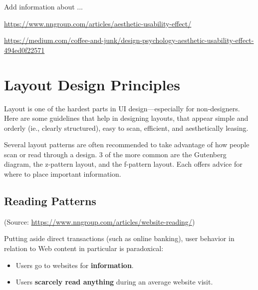 \begin{tcolorbox}[
	width=\textwidth,
	title={\textbf{Excursus: What is the Aesthetic-Usability Effect?}},
	outer arc=0mm,
	arc=0mm,
	boxrule=1pt,
	]    
Add information about ...
\par \url{https://www.nngroup.com/articles/aesthetic-usability-effect/} 
\par \url{https://medium.com/coffee-and-junk/design-psychology-aesthetic-usability-effect-494ed0f22571}
\end{tcolorbox}

\label{sec:design_guidelines}

\section{Layout Design Principles} %
\label{sub:layout_design_principles}
Layout is one of the hardest parts in UI design---especially for non-designers.
Here are some guidelines that help in designing layouts, that appear simple and orderly (ie., clearly structured), easy to scan, efficient, and aesthetically leasing.

Several layout patterns are often recommended to take advantage of how people scan or read through a design. 3 of the more common are the Gutenberg diagram, the z-pattern layout, and the f-pattern layout. Each offers advice for where to place important information.



\subsection{Reading Patterns} %
\label{sub:reading_patterns}
(Source: \url{https://www.nngroup.com/articles/website-reading/})

Putting aside direct transactions (such as online banking), user behavior in relation to Web content in particular is paradoxical:
\begin{itemize}[--->]
	\item Users go to websites for \textbf{information}.
	\item Users \textbf{scarcely read anything} during an average website visit.
\end{itemize}


